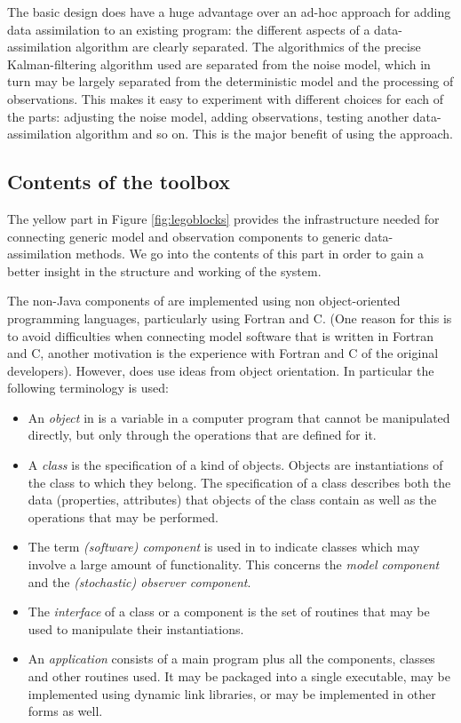 The basic design does have a huge advantage over an ad-hoc approach for adding data assimilation to an existing program: the different aspects of a data-assimilation algorithm are clearly separated. The algorithmics of the precise Kalman-filtering algorithm used are separated from the noise model, which in turn may be largely separated from the deterministic model and the processing of observations. This makes it easy to experiment with different choices for each of the parts: adjusting the noise model, adding observations, testing another data-assimilation algorithm and so on. This is the major benefit of using the \oda approach.

\subsection{Contents of the \oda toolbox}\label{sec:OO}

The yellow part in Figure \ref{fig:legoblocks} provides the infrastructure needed for connecting generic model and observation components to generic data-assimilation methods. We go into the contents of this part in order to gain a better insight in the structure and working of the \oda system.

The non-Java components of \oda are implemented using non object-oriented programming languages, particularly using Fortran and C. (One reason for this is to avoid difficulties when connecting model software that is written in Fortran and C, another motivation is the experience with Fortran and C of the original developers). However, \oda does use ideas from object orientation. In particular the following terminology is used:

\begin{itemize}
	\item An \emph{object} in \oda is a variable in a computer program that cannot be manipulated directly, but only through the operations that are defined for it. 
	\item A \emph{class} is the specification of a kind of objects. Objects are instantiations of the class to which they belong. The specification of a class describes both the data (properties, attributes) that objects of the class contain as well as the operations that may be performed. 
	\item The term \emph{(software) component} is used in \oda to indicate classes which may involve a large amount of functionality. This concerns the \emph{\oda model component} and the \emph{\oda (stochastic) observer component}. 
	\item The \emph{interface} of a class or a component is the set of routines that may be used to manipulate their instantiations. 
	\item An \emph{\oda application} consists of a main program plus all the components, classes and other routines used. It may be packaged into a single executable, may be implemented using dynamic link libraries, or may be implemented in other forms as well. 
\end{itemize}


